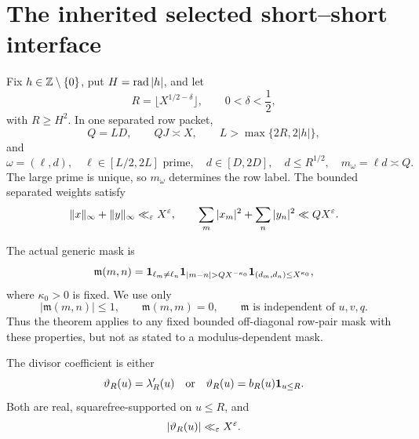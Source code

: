 \section{The inherited selected short--short interface}
\label{sec:interface}

Fix \(h\in\mathbb Z\setminus\{0\}\), put \(H=\operatorname{rad}|h|\), and let
\begin{equation}
 R=\lfloor X^{1/2-\delta}\rfloor,\qquad 0<\delta<\frac12,
 \label{eq:R-def}
\end{equation}
with \(R\ge H^2\).  In one separated row packet,
\begin{equation}
 Q=LD,\qquad QJ\asymp X,\qquad L>\max\{2R,2|h|\},
 \label{eq:row-scales}
\end{equation}
and
\begin{equation}
 \omega=(\ell,d),\quad \ell\in[L/2,2L]\text{ prime},\quad
 d\in[D,2D],\quad d\le R^{1/2},\quad m_\omega=\ell d\asymp Q.
 \label{eq:rows}
\end{equation}
The large prime is unique, so \(m_\omega\) determines the row label.
The bounded separated weights satisfy
\begin{equation}
 \|x\|_\infty+\|y\|_\infty\ll_\varepsilon X^\varepsilon,\qquad
 \sum_m|x_m|^2+\sum_n|y_n|^2\ll QX^\varepsilon.
 \label{eq:row-energy}
\end{equation}

The actual generic mask is
\begin{equation}
 \mathfrak m(m,n)=\one_{\ell_m\ne\ell_n}
 \one_{|m-n|>QX^{-\kappa_0}}
 \one_{(d_m,d_n)\le X^{\kappa_0}},
 \label{eq:generic-mask}
\end{equation}
where \(\kappa_0>0\) is fixed.  We use only
\begin{equation}
 |\mathfrak m(m,n)|\le1,\qquad \mathfrak m(m,m)=0,\qquad
 \mathfrak m\text{ is independent of }u,v,q.
 \label{eq:mask-properties}
\end{equation}
Thus the theorem applies to any fixed bounded off-diagonal row-pair mask
with these properties, but not as stated to a modulus-dependent mask.

The divisor coefficient is either
\begin{equation}
 \vartheta_R(u)=\lambda'_R(u)
 \quad\text{or}\quad \vartheta_R(u)=b_R(u)\mathbf 1_{u\le R}.
 \label{eq:theta-choices}
\end{equation}
Both are real, squarefree-supported on \(u\le R\), and
\begin{equation}
 |\vartheta_R(u)|\ll_\varepsilon X^\varepsilon.
 \label{eq:theta-bound}
\end{equation}

